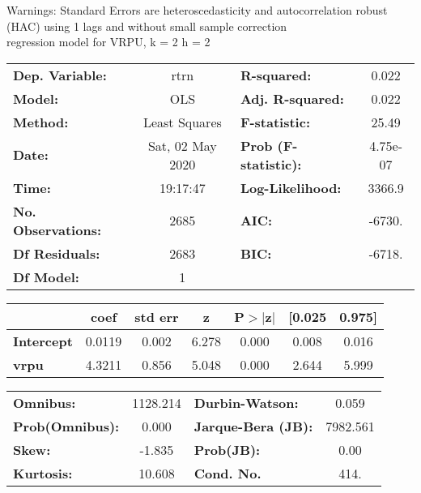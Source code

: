 Warnings: \newline
 [1] Standard Errors are heteroscedasticity and autocorrelation robust (HAC) using 1 lags and without small sample correction\\ 

regression model for VRPU, k = 2 h = 2\begin{center}
\begin{tabular}{lclc}
\toprule
\textbf{Dep. Variable:}    &       rtrn       & \textbf{  R-squared:         } &     0.022   \\
\textbf{Model:}            &       OLS        & \textbf{  Adj. R-squared:    } &     0.022   \\
\textbf{Method:}           &  Least Squares   & \textbf{  F-statistic:       } &     25.49   \\
\textbf{Date:}             & Sat, 02 May 2020 & \textbf{  Prob (F-statistic):} &  4.75e-07   \\
\textbf{Time:}             &     19:17:47     & \textbf{  Log-Likelihood:    } &    3366.9   \\
\textbf{No. Observations:} &        2685      & \textbf{  AIC:               } &    -6730.   \\
\textbf{Df Residuals:}     &        2683      & \textbf{  BIC:               } &    -6718.   \\
\textbf{Df Model:}         &           1      & \textbf{                     } &             \\
\bottomrule
\end{tabular}
\begin{tabular}{lcccccc}
                   & \textbf{coef} & \textbf{std err} & \textbf{z} & \textbf{P$> |$z$|$} & \textbf{[0.025} & \textbf{0.975]}  \\
\midrule
\textbf{Intercept} &       0.0119  &        0.002     &     6.278  &         0.000        &        0.008    &        0.016     \\
\textbf{vrpu}      &       4.3211  &        0.856     &     5.048  &         0.000        &        2.644    &        5.999     \\
\bottomrule
\end{tabular}
\begin{tabular}{lclc}
\textbf{Omnibus:}       & 1128.214 & \textbf{  Durbin-Watson:     } &    0.059  \\
\textbf{Prob(Omnibus):} &   0.000  & \textbf{  Jarque-Bera (JB):  } & 7982.561  \\
\textbf{Skew:}          &  -1.835  & \textbf{  Prob(JB):          } &     0.00  \\
\textbf{Kurtosis:}      &  10.608  & \textbf{  Cond. No.          } &     414.  \\
\bottomrule
\end{tabular}
\end{center}

